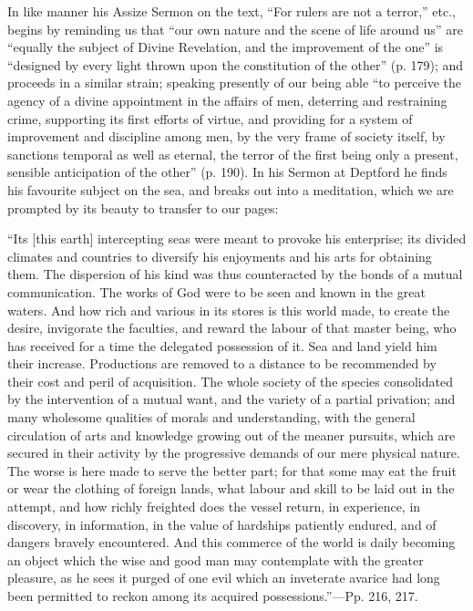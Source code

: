 In like manner his Assize Sermon on the text, ``For
rulers are not a terror,'' etc., begins by reminding us that ``our own
nature and the scene of life around us'' are ``equally the subject of
Divine Revelation, and the improvement of the one'' is ``designed by
every light thrown upon the constitution of the other'' (p. 179); and
proceeds in a similar strain; speaking presently of our being able ``to
perceive the agency of a divine appointment in the affairs of men,
deterring and restraining crime, supporting its first efforts of
virtue, and providing for a system of improvement and discipline among
men, by the very frame of society itself, by sanctions temporal as
well as eternal, the terror of the first being only a present,
sensible anticipation of the other'' (p. 190). In his Sermon at
Deptford he finds his favourite subject on the sea, and breaks out
into a meditation, which we are prompted by its beauty to transfer to
our pages:

``Its
[this earth] intercepting seas were meant to provoke his enterprise;
its divided climates and countries to diversify his enjoyments and his
arts for obtaining them. The dispersion of his kind was thus
counteracted by the bonds of a mutual communication. The works of God
were to be seen and known in the great waters. And how rich and
various in its stores is this world made, to create the
desire, invigorate the faculties, and reward the labour of that master
being, who has received for a time the delegated possession of it. Sea
and land yield him their increase. Productions are removed to a
distance to be recommended by their cost and peril of acquisition. The
whole society of the species consolidated by the intervention of a
mutual want, and the variety of a partial privation; and many
wholesome qualities of morals and understanding, with the general
circulation of arts and knowledge growing out of the meaner pursuits,
which are secured in their activity by the progressive demands of our
mere physical nature. The worse is here made to serve the better part;
for that some may eat the fruit or wear the clothing of foreign lands,
what labour and skill to be laid out in the attempt, and how richly
freighted does the vessel return, in experience, in discovery, in
information, in the value of hardships patiently endured, and of
dangers bravely encountered. And this commerce of the world is daily
becoming an object which the wise and good man may contemplate with
the greater pleasure, as he sees it purged of one evil which an
inveterate avarice had long been permitted to reckon among its
acquired possessions.''—Pp. 216, 217.

